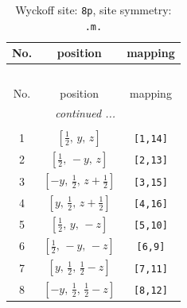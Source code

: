 \documentclass[fleqn,8pt]{jsarticle}
\begin{document}
\begin{longtable}{ccc}
\caption{Wyckoff site: {\tt 8p}, site symmetry: {\tt .m.}}
 \\
 \hline \hline
No. & position & mapping \\ \hline \endfirsthead

\multicolumn{2}{l}{\tablename\ \thetable{}} \\
 \hline \hline
No. & position & mapping \\ \hline \endhead

 \hline \hline
\multicolumn{2}{r}{\footnotesize\it continued ...} \\ \endfoot

 \hline \hline
\multicolumn{2}{r}{} \\ \endlastfoot

1 & $\left[ \frac{1}{2},\, y,\, z \right]$ & {\tt [1,14]} \\ \hline
2 & $\left[ \frac{1}{2},\, - y,\, z \right]$ & {\tt [2,13]} \\ \hline
3 & $\left[ - y,\, \frac{1}{2},\, z + \frac{1}{2} \right]$ & {\tt [3,15]} \\ \hline
4 & $\left[ y,\, \frac{1}{2},\, z + \frac{1}{2} \right]$ & {\tt [4,16]} \\ \hline
5 & $\left[ \frac{1}{2},\, y,\, - z \right]$ & {\tt [5,10]} \\ \hline
6 & $\left[ \frac{1}{2},\, - y,\, - z \right]$ & {\tt [6,9]} \\ \hline
7 & $\left[ y,\, \frac{1}{2},\, \frac{1}{2} - z \right]$ & {\tt [7,11]} \\ \hline
8 & $\left[ - y,\, \frac{1}{2},\, \frac{1}{2} - z \right]$ & {\tt [8,12]} \\
\end{longtable}
\renewcommand{\arraystretch}{1.2}
\end{document}

